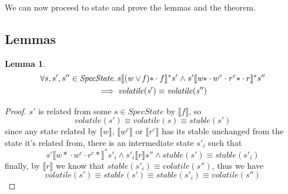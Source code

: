 \documentclass[letterpaper,twocolumn,10pt]{article}
\theoremstyle{definition}
\newtheorem{lemma}[theorem]{Lemma}
\newcommand{\conj}{\mathrel\land}
\renewcommand{\i}[1]{\ensuremath{\mathit{#1}}}
\begin{document}
We can now proceed to state and prove the lemmas and the theorem.

\subsection{Lemmas}

\begin{lemma}\label{lemma-2-1}
\begin{multline*}
	\forall s, s', s'' \in \i{SpecState} \ldotp s \llbracket \i{(w \lor f)\ast} \cdot f \rrbracket^* s' \conj s' \llbracket \i{w\ast} \cdot w^c \cdot \i{r^c\ast} \cdot r \rrbracket^* s'' \\
	  \implies \i{volatile(s')} \equiv \i{volatile(s'')}
\end{multline*}
\end{lemma}
\begin{proof}
	$s'$ is related from some $s \in \i{SpecState}$ by $\llbracket f \rrbracket$, so
		$$\i{volatile(s')} \equiv \i{volatile(s)} \equiv \i{stable(s')}$$
	since any state related by $\llbracket w \rrbracket$, $\llbracket w^c \rrbracket$ or $\llbracket r^c \rrbracket$ has its stable unchanged from the state it's related from, there is an intermediate state $s'_i$ such that
		$$s' \llbracket {w*} \cdot w^c \cdot {r^c *} \rrbracket^* s'_i \conj s'_i \llbracket r \rrbracket s'' \conj stable(s') \equiv stable(s'_i)$$
	finally, by $\llbracket r \rrbracket$ we know that $\i{stable(s'_i) \equiv volatile(s'')}$, thus we have
		$$\i{volatile(s') \equiv stable(s') \equiv stable(s'_i) \equiv volatile(s'')}$$
\end{proof}
\end{document}
